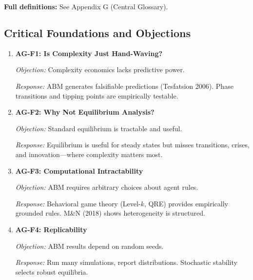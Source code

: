 \textbf{Full definitions:} See Appendix G (Central Glossary).

\subsection{Critical Foundations and Objections}
\label{sec:ag-foundations}


\begin{enumerate}
    \item \textbf{AG-F1: Is Complexity Just Hand-Waving?}

    \textit{Objection:} Complexity economics lacks predictive power.

    \textit{Response:} ABM generates falsifiable predictions (Tesfatsion 2006).
    Phase transitions and tipping points are empirically testable.

    \item \textbf{AG-F2: Why Not Equilibrium Analysis?}

    \textit{Objection:} Standard equilibrium is tractable and useful.

    \textit{Response:} Equilibrium is useful for steady states but misses
    transitions, crises, and innovation---where complexity matters most.

    \item \textbf{AG-F3: Computational Intractability}

    \textit{Objection:} ABM requires arbitrary choices about agent rules.

    \textit{Response:} Behavioral game theory (Level-$k$, QRE) provides
    empirically grounded rules. M\&N (2018) shows heterogeneity is structured.

    \item \textbf{AG-F4: Replicability}

    \textit{Objection:} ABM results depend on random seeds.

    \textit{Response:} Run many simulations, report distributions. Stochastic
    stability selects robust equilibria.
\end{enumerate}

